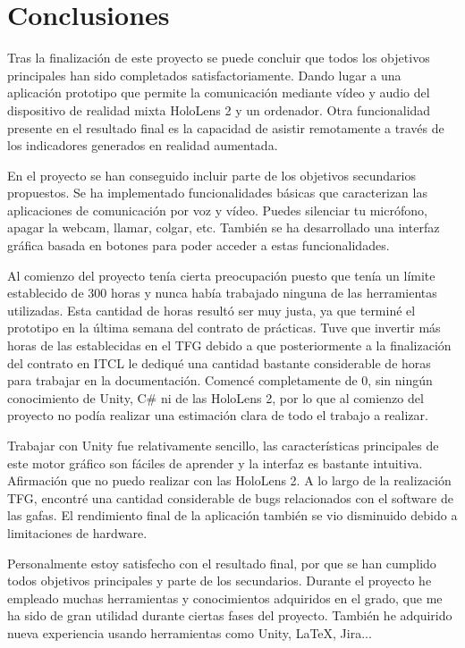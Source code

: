 
\section{Conclusiones}

Tras la finalización de este proyecto se puede concluir que todos los objetivos principales han sido completados satisfactoriamente. Dando lugar a una aplicación prototipo que permite la comunicación mediante vídeo y audio del dispositivo de realidad mixta HoloLens 2 y un ordenador. Otra funcionalidad presente en el resultado final es la capacidad de asistir remotamente a través de los indicadores generados en realidad aumentada.

En el proyecto se han conseguido incluir parte de los objetivos secundarios propuestos. Se ha implementado funcionalidades básicas que caracterizan las aplicaciones de comunicación por voz y vídeo. Puedes silenciar tu micrófono, apagar la webcam, llamar, colgar, etc. También se ha desarrollado una interfaz gráfica basada en botones para poder acceder a estas funcionalidades.

Al comienzo del proyecto tenía cierta preocupación puesto que tenía un límite establecido de 300 horas y nunca había trabajado ninguna de las herramientas utilizadas. Esta cantidad de horas resultó ser muy justa, ya que terminé el prototipo en la última semana del contrato de prácticas. Tuve que invertir más horas de las establecidas en el TFG debido a que posteriormente a la finalización del contrato en ITCL le dediqué una cantidad bastante considerable de horas para trabajar en la documentación. Comencé completamente de 0, sin ningún conocimiento de Unity, C\# ni de las HoloLens 2, por lo que al comienzo del proyecto no podía realizar una estimación clara de todo el trabajo a realizar.

Trabajar con Unity fue relativamente sencillo, las características principales de este motor gráfico son fáciles de aprender y la interfaz es bastante intuitiva. Afirmación que no puedo realizar con las HoloLens 2. A lo largo de la realización TFG, encontré una cantidad considerable de bugs relacionados con el software de las gafas. El rendimiento final de la aplicación también se vio disminuido debido a limitaciones de hardware.

Personalmente estoy satisfecho con el resultado final, por que se han cumplido todos objetivos principales y parte de los secundarios. Durante el proyecto he empleado muchas herramientas y conocimientos adquiridos en el grado, que me ha sido de gran utilidad durante ciertas fases del proyecto. También he adquirido nueva experiencia usando herramientas como Unity, \LaTeX, Jira... 


